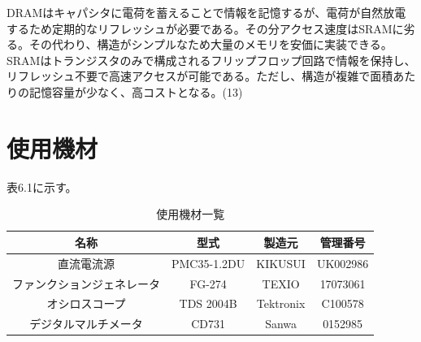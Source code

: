 \documentclass{jlreq}
\numberwithin{equation}{section}
\begin{document}
DRAMはキャパシタに電荷を蓄えることで情報を記憶するが、電荷が自然放電するため定期的なリフレッシュが必要である。その分アクセス速度はSRAMに劣る。その代わり、構造がシンプルなため大量のメモリを安価に実装できる。\\
SRAMはトランジスタのみで構成されるフリップフロップ回路で情報を保持し、リフレッシュ不要で高速アクセスが可能である。ただし、構造が複雑で面積あたりの記憶容量が少なく、高コストとなる。(13)

\section{使用機材}
表6.1に示す。
\begin{table}[H]
  \centering
  \caption{使用機材一覧}
  \begin{tabular}{|c|c|c|c|}
    \hline
    名称 & 型式 & 製造元 & 管理番号 \\ \hline
    直流電流源 & PMC35-1.2DU & KIKUSUI & UK002986 \\ \hline
    ファンクションジェネレータ & FG-274 & TEXIO & 17073061 \\ \hline
    オシロスコープ & TDS 2004B & Tektronix & C100578 \\ \hline
    デジタルマルチメータ & CD731 & Sanwa & 0152985 \\ \hline
  \end{tabular}
\end{table}
\end{document}
